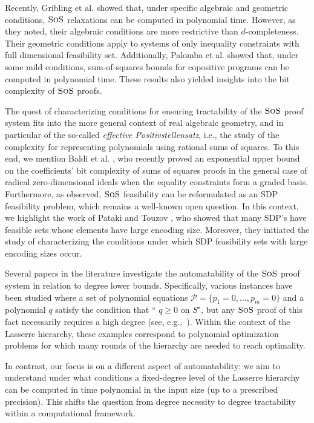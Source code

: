 \documentclass[11pt]{article}
\newcommand{\sos}{\text{\sc{SoS}}}
\newcommand{\1}{\textbf{1}}
\begin{document}
Recently, Gribling et al. \cite{Gribling23} showed that, under specific algebraic and geometric conditions, $\sos$ relaxations can be computed in polynomial time. However, as they noted, their algebraic conditions are more restrictive than $d$-completeness. Their geometric conditions apply to systems of only inequality constraints with full dimensional feasibility set.  Additionally, Palomba et al. \cite{palomba} showed that, under some mild conditions, sum-of-squares bounds for copositive programs can be computed in polynomial time. These results also yielded insights into the bit complexity of $\sos$ proofs.


The quest of characterizing conditions for ensuring tractability of the $\sos$ proof system fits into the more general context of real algebraic geometry, and in particular of the so-called \textit{effective Positivstellensatz}, i.e., the study of the complexity for representing polynomials using rational sums of squares. To this end, we mention Baldi et al. \cite{BaldiKM24}, who recently proved an exponential upper bound on the coefficients' bit complexity of sums of squares proofs in the general case of radical zero-dimensional ideals when the equality constraints form a graded basis.
Furthermore, as observed, $\sos$ feasibility can be reformulated as an SDP feasibility problem, which remains a well-known open question.
In this context, we highlight the work of Pataki and Touzov \cite{PatakiT24}, who showed that many SDP's have feasible sets whose elements have large encoding size. Moreover, they initiated the study of characterizing the conditions under which SDP feasibility sets with large encoding sizes occur.


Several papers in the literature investigate the automatability of the $\sos$ proof system in relation to degree lower bounds. Specifically, various instances have been studied where a set of polynomial equations $\mathcal{P} = \{p_1=0, \ldots, p_m=0\}$ and a polynomial $q$ satisfy the condition that `` $q \geq 0$ on $S$", but any $\sos$ proof of this fact necessarily requires a high degree (see, e.g.,~\cite{GrigorievHP_MMJ02,KLM-hard-prob-formulation,KLM-unbounded-SOS-hierarchy-integrality-gap,KLM-tight-SOS-LB-binary-POP,KLM-SOS-hierarchy-LB-symmetric-formulations,potechin:SOS-LB-from-symmetry}). Within the context of the Lasserre hierarchy, these examples correspond to polynomial optimization problems for which many rounds of the hierarchy are needed to reach optimality.

In contrast, our focus is on a different aspect of automatability: we aim to understand under what conditions a fixed-degree level of the Lasserre hierarchy can be computed in time polynomial in the input size (up to a prescribed precision). This shifts the question from degree necessity to degree tractability within a computational framework.
\end{document}

